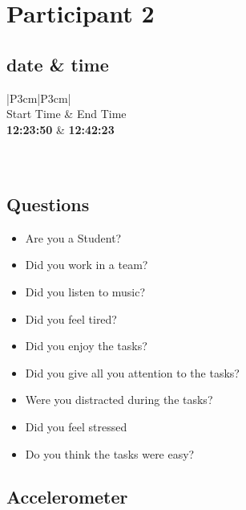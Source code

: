 \section{Participant 2}


\subsection{date \& time}
\begin{table}[ht]
  \begin{tabular}{|P{3cm}|P{3cm}|}
	    	\\ \hline
    Start Time      			& End Time   					\\ \hline
   \textbf{12:23:50} 	& \textbf{12:42:23}    	\\ \hline
       						\\ \hline
    			\\ \hline
  \end{tabular}
  \newline\newline
  \caption{p2: date and time}\label{dandt2}
\end{table}

\subsection{Questions}
\begin{itemize} 
  \item[\XSolidBrush] Are you a Student?
  \item[\Checkmark] Did you work in a team?
  \item[\Checkmark] Did you listen to music?
  \item[\XSolidBrush] Did you feel tired?
  \item[\Checkmark] Did you enjoy the tasks?
  \item[\Checkmark] Did you give all you attention to the tasks?
  \item[\XSolidBrush] Were you distracted during the tasks?
  \item[\XSolidBrush] Did you feel stressed
  \item[\Checkmark] Do you think the tasks were easy?  
\end{itemize}


\FloatBarrier
\newpage
\subsection{Accelerometer}

